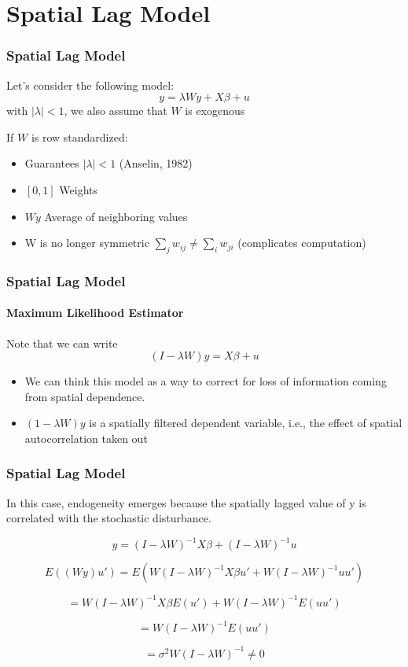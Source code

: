 \documentclass[
  shownotes,
  xcolor={svgnames},
  hyperref={colorlinks,citecolor=DarkBlue,linkcolor=DarkRed,urlcolor=DarkBlue}
  ]{beamer}
\begin{document}
\section{Spatial Lag Model}
\begin{frame}[fragile]
\frametitle{Spatial Lag Model}

Let's consider the following model:
\bigskip 
\[
y=\lambda Wy+X\beta+u
\]
\medskip
with $|\lambda|<1$, we also assume that $W$ is exogenous

\medskip

If $W$ is row standardized:
\medskip
\begin{itemize}
\item Guarantees $|\lambda|<1$ (Anselin, 1982) 
\item $[0,1]$ Weights
\item $Wy$ Average of neighboring values
\item W is no longer symmetric $\sum_{j}w_{ij}\neq\sum_{i}w_{ji}$ (complicates
computation)
\end{itemize}

\end{frame}
\begin{frame}[fragile]
\frametitle{Spatial Lag Model}
\framesubtitle{Maximum Likelihood Estimator}

Note that we can write 
\bigskip 
\[
(I-\lambda W)y=X\beta+u
\]
\bigskip 
\begin{itemize}
\item We can think this model as a way to correct for loss of information coming from spatial dependence.
\bigskip 
\item $(1-\lambda W)y$ is a spatially filtered dependent variable, i.e.,
the effect of spatial autocorrelation taken out
\end{itemize}

\end{frame}
\begin{frame}[fragile]
\frametitle{Spatial Lag Model}

In this case, endogeneity emerges because the spatially lagged value
of y is correlated with the stochastic disturbance. 

\[
y=(I-\lambda W)^{-1}X\beta+(I-\lambda W)^{-1}u
\]

\[
E((Wy)u')=E(W(I-\lambda W)^{-1}X\beta u'+W(I-\lambda W)^{-1}uu')
\]

\[
=W(I-\lambda W)^{-1}X\beta E(u')+W(I-\lambda W)^{-1}E(uu')
\]

\[
=W(I-\lambda W)^{-1}E(uu')
\]

\[
=\sigma^{2}W(I-\lambda W)^{-1}\neq0
\]

\end{frame}
\end{document}
